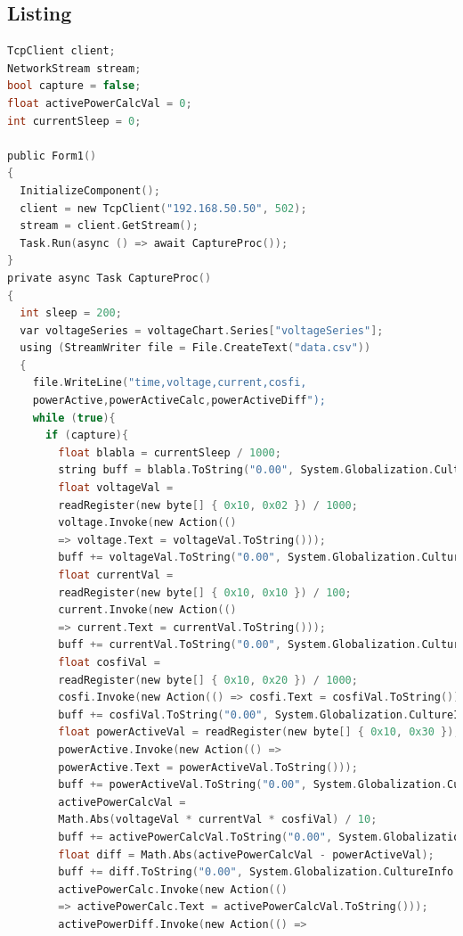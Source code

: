 \documentclass[12pt]{article}
\begin{document}
\subsection{Listing}
\begin{lstlisting}[language=c]
TcpClient client;
NetworkStream stream;
bool capture = false;
float activePowerCalcVal = 0;
int currentSleep = 0;

public Form1()
{
  InitializeComponent();
  client = new TcpClient("192.168.50.50", 502);
  stream = client.GetStream();
  Task.Run(async () => await CaptureProc());
}
private async Task CaptureProc()
{
  int sleep = 200;
  var voltageSeries = voltageChart.Series["voltageSeries"];
  using (StreamWriter file = File.CreateText("data.csv"))
  {
    file.WriteLine("time,voltage,current,cosfi,
    powerActive,powerActiveCalc,powerActiveDiff");
    while (true){
      if (capture){
        float blabla = currentSleep / 1000;
        string buff = blabla.ToString("0.00", System.Globalization.CultureInfo.InvariantCulture);
        float voltageVal = 
        readRegister(new byte[] { 0x10, 0x02 }) / 1000;
        voltage.Invoke(new Action(()
        => voltage.Text = voltageVal.ToString()));
        buff += voltageVal.ToString("0.00", System.Globalization.CultureInfo.InvariantCulture) + ",";
        float currentVal = 
        readRegister(new byte[] { 0x10, 0x10 }) / 100;
        current.Invoke(new Action(() 
        => current.Text = currentVal.ToString()));
        buff += currentVal.ToString("0.00", System.Globalization.CultureInfo.InvariantCulture) + ",";
        float cosfiVal = 
        readRegister(new byte[] { 0x10, 0x20 }) / 1000;
        cosfi.Invoke(new Action(() => cosfi.Text = cosfiVal.ToString()));
        buff += cosfiVal.ToString("0.00", System.Globalization.CultureInfo.InvariantCulture) + ",";
        float powerActiveVal = readRegister(new byte[] { 0x10, 0x30 });
        powerActive.Invoke(new Action(() => 
        powerActive.Text = powerActiveVal.ToString()));
        buff += powerActiveVal.ToString("0.00", System.Globalization.CultureInfo.InvariantCulture) + ",";
        activePowerCalcVal =
        Math.Abs(voltageVal * currentVal * cosfiVal) / 10;
        buff += activePowerCalcVal.ToString("0.00", System.Globalization.CultureInfo.InvariantCulture) + ",";
        float diff = Math.Abs(activePowerCalcVal - powerActiveVal);
        buff += diff.ToString("0.00", System.Globalization.CultureInfo.InvariantCulture);
        activePowerCalc.Invoke(new Action(() 
        => activePowerCalc.Text = activePowerCalcVal.ToString()));
        activePowerDiff.Invoke(new Action(() => 

\end{lstlisting}
\end{document}
